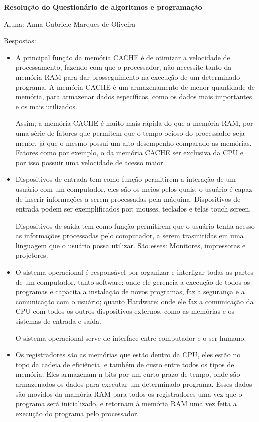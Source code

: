 \documentclass[a4paper, 12pt]{article}
\begin{document}
\begin{center}
\textbf{Resolução do Questionário de algoritmos e programação}

\tiny{Aluna: Anna Gabriele Marques de Oliveira}
\end{center}
Respostas:
\begin{itemize}
\item A principal função da memória CACHE é de otimizar a velocidade de processamento, fazendo com que o processador, não necessite tanto da memória RAM para dar prosseguimento na execução de um determinado programa. A memória CACHE é um armazenamento de menor quantidade de memória, para armazenar dados específicos, como os dados mais importantes e os mais utilizados.

 Assim, a memória CACHE é muito mais rápida do que a memória RAM, por uma série de fatores que permitem que o tempo ocioso do processador seja menor, já que o mesmo possui um alto desempenho comparado as memórias. Fatores como por exemplo, o da memória CACHE ser exclusiva da CPU e por isso possuir uma velocidade de acesso maior.
\vspace{0.3cm} 

\item Dispositivos de entrada tem como função permitirem a interação de um usuário com um computador, eles são os meios pelos quais, o usuário é capaz de inserir informações a serem processadas pela máquina. Dispositivos de entrada podem ser exemplificados por: mouses, teclados e telas touch screen.

Dispositivos de saída tem como função permitirem que o usuário tenha acesso as informações processadas pelo computador, a serem trasmitidas em uma linguagem que o usuário possa utilizar. São esses: Monitores, impressoras e projetores.
\vspace{0.3cm}

\item O sistema operacional é responsável por organizar e interligar todas as partes de um computador, tanto software: onde ele gerencia a execução de todos os programas e capacita a instalação de novos programas, faz a segurança e a comunicação com o usuário; quanto Hardware: onde ele faz a comunicação da CPU com todos os outros dispositivos externos, como as memórias e os sistemas de entrada e saída.

O sistema operacional serve de interface entre computador e o ser humano.

\vspace{0.3cm}
\item Os registradores são as memórias que estão dentro da CPU, eles estão no topo da cadeia de eficiência, e também de custo entre todos os tipos de memória. Eles armazenam n bits por um curto prazo de tempo, onde são armazenados os dados para executar um determinado programa. Esses dados são movidos da mamória RAM para todos os registradores uma vez que o programa será inicializado, e retornam à memória RAM uma vez feita a execução do programa pelo processador.


\end{itemize}
\end{document}
